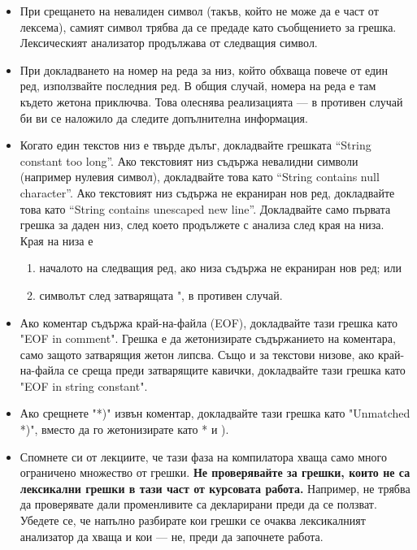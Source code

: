\documentclass[11pt]{article}
\begin{document}
\begin{itemize}
    \item При срещането на невалиден символ (такъв, който не може да е част от лексема), самият символ трябва да се предаде като съобщението за грешка.
        Лексическият анализатор продължава от следващия символ.
    \item При докладването на номер на реда за низ, който обхваща повече от един ред, използвайте последния ред.
        В общия случай, номера на реда е там където жетона приключва.
        Това олеснява реализацията --- в противен случай би ви се наложило да следите допълнителна информация.
    \item Когато един текстов низ е твърде дълъг, докладвайте грешката ``String constant too long''.
        Ако текстовият низ съдържа невалидни символи (например нулевия символ), докладвайте това като ``String contains null character''. 
        Ако текстовият низ съдържа не екраниран нов ред, докладвайте това като ``String contains unescaped new line''.
        Докладвайте само първата грешка за даден низ, след което продължете с анализа след края на низа.
        Края на низа е \begin{enumerate}
            \item началото на следващия ред, ако низа съдържа не екраниран нов ред; или
            \item символът след затварящата ", в противен случай.
        \end{enumerate}
    \item Ако коментар съдържа край-на-файла (EOF), докладвайте тази грешка като "EOF in comment".
        Грешка е да жетонизирате съдържанието на коментара, само защото затварящия жетон липсва.
        Също и за текстови низове, ако край-на-файла се среща преди затварящите кавички, докладвайте тази грешка като "EOF in string constant".
    \item Ако срещнете "*)" извън коментар, докладвайте тази грешка като "Unmatched *)", вместо да го жетонизирате като * и ).
    \item Спомнете си от лекциите, че тази фаза на компилатора хваща само много ограничено множество от грешки.
        \textbf{Не проверявайте за грешки, които не са лексикални грешки в тази част от курсовата работа.}
        Например, не трябва да проверявате дали променливите са декларирани преди да се ползват.
        Убедете се, че напълно разбирате кои грешки се очаква лексикалният анализатор да хваща и кои --- не, преди да започнете работа.
\end{itemize}
\end{document}
